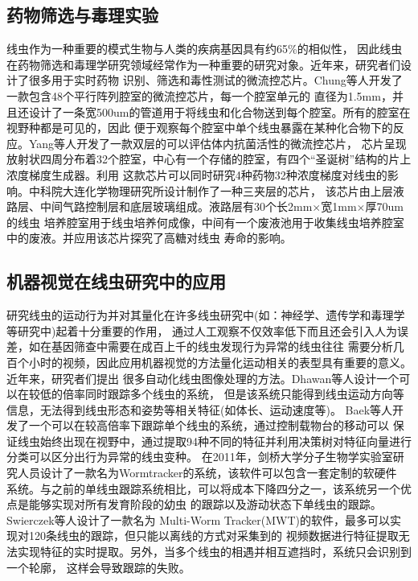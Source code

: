 \subsection{药物筛选与毒理实验}
\label{sec:intro:analog}
	线虫作为一种重要的模式生物与人类的疾病基因具有约65\%的相似性\cite{Baumeister2002The,Sonnhammer1997Analysis}，
	因此线虫在药物筛选和毒理学研究领域经常作为一种重要的研究对象。近年来，研究者们设计了很多用于实时药物
	识别、筛选和毒性测试的微流控芯片。Chung等人\cite{Chung2011Microfluidic}开发了一款包含48个平行阵列腔室的微流控芯片，每一个腔室单元的
	直径为1.5mm，并且还设计了一条宽500um的管道用于将线虫和化合物送到每个腔室。所有的腔室在视野种都是可见的，因此
	便于观察每个腔室中单个线虫暴露在某种化合物下的反应。Yang等人\cite{Yang2013An}开发了一款双层的可以评估体内抗菌活性的微流控芯片，
	芯片呈现放射状四周分布着32个腔室，中心有一个存储的腔室，有四个“圣诞树”结构的片上浓度梯度生成器\cite{Dertinger2001Generation,Jeon2000Generation}。利用
	这款芯片可以同时研究4种药物32种浓度梯度对线虫的影响。中科院大连化学物理研究所设计制作了一种三夹层的芯片，
	该芯片由上层液路层、中间气路控制层和底层玻璃组成。液路层有30个长2mm$\times$宽1mm$\times$厚70um的线虫
	培养腔室用于线虫培养何成像，中间有一个废液池用于收集线虫培养腔室中的废液。并应用该芯片探究了高糖对线虫
	寿命的影响\cite{zhuliguo2016}。
	
\subsection{机器视觉在线虫研究中的应用}
\label{sec:intro:analog}
	研究线虫的运动行为并对其量化在许多线虫研究中(如：神经学、遗传学和毒理学等研究中)起着十分重要的作用，
	通过人工观察不仅效率低下而且还会引入人为误差，如在基因筛查中需要在成百上千的线虫发现行为异常的线虫往往
	需要分析几百个小时的视频，因此应用机器视觉的方法量化运动相关的表型具有重要的意义。近年来，研究者们提出
	很多自动化线虫图像处理的方法。Dhawan等人\cite{De1998Natural}设计一个可以在较低的倍率同时跟踪多个线虫的系统，
	但是该系统只能得到线虫运动方向等信息，无法得到线虫形态和姿势等相关特征(如体长、运动速度等)。
	Baek等人\cite{Baek2002Using}开发了一个可以在较高倍率下跟踪单个线虫的系统，通过控制载物台的移动可以
	保证线虫始终出现在视野中，通过提取94种不同的特征并利用决策树对特征向量进行分类可以区分出行为异常的线虫变种。
	在2011年，剑桥大学分子生物学实验室研究人员设计了一款名为Wormtracker的系统，该软件可以包含一套定制的软硬件
	系统\cite{yemini2013high}。与之前的单线虫跟踪系统相比，可以将成本下降四分之一，该系统另一个优点是能够实现对所有发育阶段的幼虫
	的跟踪以及游动状态下单线虫的跟踪。Swierczek等人\cite{swierczek2011high}设计了一款名为
	Multi-Worm Tracker(MWT)的软件，最多可以实现对120条线虫的跟踪，但只能以离线的方式对采集到的
	视频数据进行特征提取无法实现特征的实时提取。另外，当多个线虫的相遇并相互遮挡时，系统只会识别到一个轮廓，
	这样会导致跟踪的失败。
	
